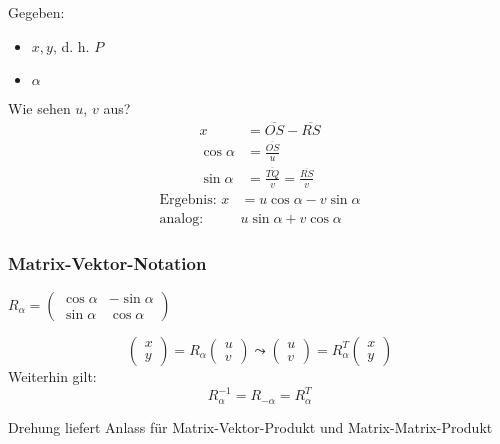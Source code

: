 \noindent Gegeben:
\begin{itemize}
	\item $x, y$, d. h. $P$
	\item $\alpha$
\end{itemize}
%
Wie sehen $u$, $v$ aus?
%
\begin{align*}
x &= \overline{OS} - \overline{RS} \\
\cos \alpha &= \frac{\overline{OS}}{u} \\
\sin \alpha &= \frac{\overline{TQ}}{v} = \frac{\overline{RS}}{v}
\end{align*}
%
\begin{align*}
\text{Ergebnis: } x &= u \cos \alpha - v \sin \alpha \\
\text{analog: } &u \sin \alpha + v \cos \alpha
\end{align*}

\subsubsection*{Matrix-Vektor-Notation}

\begin{definition}
	$ R_{\alpha} =
	\begin{pmatrix}
		\cos \alpha & -\sin \alpha \\
		\sin \alpha & \cos \alpha
 	\end{pmatrix}$
\end{definition}

\begin{equation*}
	\begin{pmatrix}
		x \\
		y
 	\end{pmatrix} = R_{\alpha} 
 	\begin{pmatrix}
		u \\
		v
 	\end{pmatrix}
 	\leadsto
 		\begin{pmatrix}
		u \\
		v
 	\end{pmatrix} = R_{\alpha}^{T}
 	\begin{pmatrix}
		x \\
		y
 	\end{pmatrix}
\end{equation*}
%
Weiterhin gilt:
\begin{equation*}
	R_{\alpha}^{-1} = R_{-\alpha} = R_{\alpha}^{T}
\end{equation*}

\begin{note}
Drehung liefert Anlass für Matrix-Vektor-Produkt und Matrix-Matrix-Produkt
\end{note}

